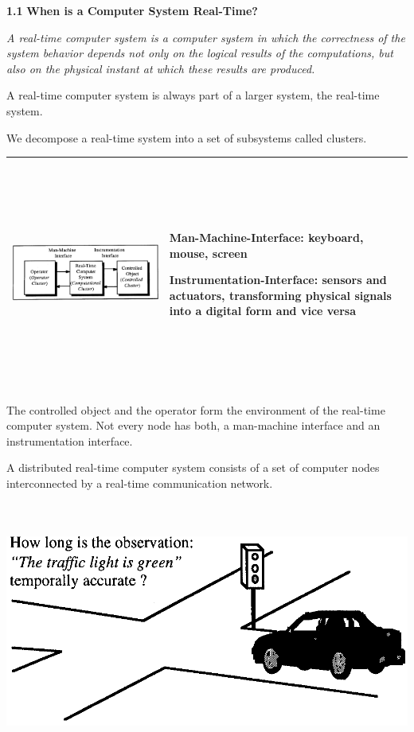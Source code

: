 \textbf{1.1} \protect\hypertarget{teil2}{}{}\textbf{When is a Computer
System Real-Time?}

\emph{A real-time computer system is a computer system in which the
correctness of the system behavior depends not only on the logical
results of the computations, but also on the physical instant at which
these results are produced.}

A real-time computer system is always part of a larger system, the
real-time system.

We decompose a real-time system into a set of subsystems called
clusters.

\begin{longtable}[c]{@{}ll@{}}
\toprule
\includegraphics[width=7.51736in,height=2.93681in]{media/Fig_1_1.png} &
Man-Machine-Interface: keyboard, mouse, screen

Instrumentation-Interface: sensors and actuators, transforming physical
signals into a digital form and vice versa\tabularnewline
\bottomrule
\end{longtable}

The controlled object and the operator form the environment of the
real-time computer system. Not every node has both, a man-machine
interface and an instrumentation interface.

A distributed real-time computer system consists of a set of computer
nodes interconnected by a real-time communication network.

\includegraphics[width=7.02222in,height=3.35556in]{media/Fig_1_2.png}

